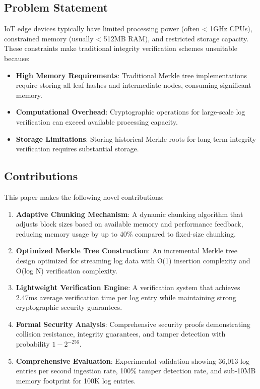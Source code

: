 \documentclass[a4paper,10pt]{article}
\begin{document}
\subsection{Problem Statement}

IoT edge devices typically have limited processing power (often < 1GHz CPUs), constrained memory (usually < 512MB RAM), and restricted storage capacity. These constraints make traditional integrity verification schemes unsuitable because:

\begin{itemize}
\item \textbf{High Memory Requirements}: Traditional Merkle tree implementations require storing all leaf hashes and intermediate nodes, consuming significant memory.
\item \textbf{Computational Overhead}: Cryptographic operations for large-scale log verification can exceed available processing capacity.
\item \textbf{Storage Limitations}: Storing historical Merkle roots for long-term integrity verification requires substantial storage.
\end{itemize}

\subsection{Contributions}

This paper makes the following novel contributions:

\begin{enumerate}
\item \textbf{Adaptive Chunking Mechanism}: A dynamic chunking algorithm that adjusts block sizes based on available memory and performance feedback, reducing memory usage by up to 40\% compared to fixed-size chunking.
\item \textbf{Optimized Merkle Tree Construction}: An incremental Merkle tree design optimized for streaming log data with O(1) insertion complexity and O(log N) verification complexity.
\item \textbf{Lightweight Verification Engine}: A verification system that achieves 2.47ms average verification time per log entry while maintaining strong cryptographic security guarantees.
\item \textbf{Formal Security Analysis}: Comprehensive security proofs demonstrating collision resistance, integrity guarantees, and tamper detection with probability $1 - 2^{-256}$.
\item \textbf{Comprehensive Evaluation}: Experimental validation showing 36,013 log entries per second ingestion rate, 100\% tamper detection rate, and sub-10MB memory footprint for 100K log entries.
\end{enumerate}
\end{document}
